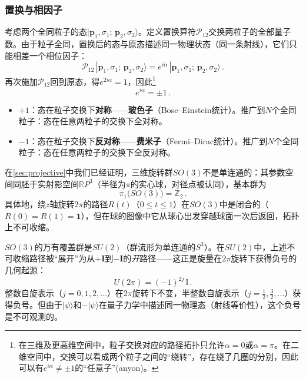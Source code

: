 \subsubsection*{置换与相因子}

考虑两个全同粒子的态$|\boldsymbol{p}_1,\sigma_1;\,\boldsymbol{p}_2,\sigma_2\rangle$。定义置换算符$\mathscr{P}_{12}$交换两粒子的全部量子数。由于粒子全同，置换后的态与原态描述同一物理状态（同一条射线），它们只能相差一个相位因子：
\begin{equation}
\mathscr{P}_{12}\,|\boldsymbol{p}_1,\sigma_1;\,\boldsymbol{p}_2,\sigma_2\rangle
= e^{i\alpha}\,|\boldsymbol{p}_1,\sigma_1;\,\boldsymbol{p}_2,\sigma_2\rangle\,.
\end{equation}
再次施加$\mathscr{P}_{12}$回到原态，得$e^{2i\alpha}=1$，因此\footnote{在三维及更高维空间中，粒子交换对应的路径拓扑只允许$\alpha=0$或$\alpha=\pi$。在二维空间中，交换可以看成两个粒子之间的``绕转''，存在绕了几圈的分别，因此可以有$e^{i\alpha}\neq\pm 1$的``任意子''(anyon)。}
\begin{equation}\label{eq:boson-fermion}
    e^{i\alpha} = \pm 1\,.
\end{equation}

\begin{itemize}
\item $+1$：态在粒子交换下\textbf{对称}——\textbf{玻色子}（Bose--Einstein统计）。推广到$N$个全同粒子：态在任意两粒子的交换下全对称。
\item $-1$：态在粒子交换下\textbf{反对称}——\textbf{费米子}（Fermi--Dirac统计）。推广到$N$个全同粒子：态在任意两粒子的交换下全反对称。
\end{itemize}
在\ref{sec:projective}中我们已经证明，三维旋转群$SO(3)$不是单连通的：其参数空间同胚于实射影空间$\mathbb{R}P^3$（半径为$\pi$的实心球，对径点被认同），基本群为
\begin{equation}
\pi_1\!\big(SO(3)\big) = \mathbb{Z}_2\,.
\end{equation}
具体地，绕$z$轴旋转$2\pi$的路径$R(t)$（$0\leqslant t\leqslant 1$）在$SO(3)$中是闭合的（$R(0)=R(1)=\mathbf{1}$），但在球的图像中它从球心出发穿越球面一次后返回，拓扑上不可收缩。

$SO(3)$的万有覆盖群是$SU(2)$（群流形为单连通的$S^3$）。在$SU(2)$中，上述不可收缩路径被``展开''为从$+\mathbf{I}$到$-\mathbf{I}$的\emph{开}路径——这正是旋量在$2\pi$旋转下获得负号的几何起源：
\begin{equation}
U(2\pi) = (-1)^{2j}\,\mathbb{I}\,.
\end{equation}
整数自旋表示（$j=0,1,2,\ldots$）在$2\pi$旋转下不变，半整数自旋表示（$j=\tfrac12,\tfrac32,\ldots$）获得负号。但由于$|\psi\rangle$和$-|\psi\rangle$在量子力学中描述同一物理态（射线等价性），这个负号是不可观测的。

